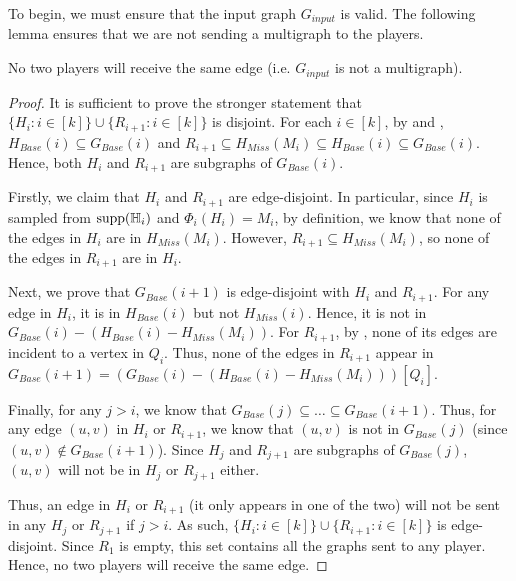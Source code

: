 \documentclass[11pt]{article}
\begin{document}
To begin, we must ensure that the input graph $G_{input}$ is valid. The following lemma ensures that we are not sending a multigraph to the players. 

\begin{lemma}\label{graph-is-not-multi}
    No two players will receive the same edge (i.e. $G_{input}$ is not a multigraph).
\end{lemma}
\begin{proof}
It is sufficient to prove the stronger statement that $\{H_i:i\in[k]\}\cup \{R_{i+1}:i\in[k]\}$ is disjoint. For each $i\in [k]$, by  and , $H_{Base}(i)\subseteq G_{Base}(i)$ and $R_{i+1}\subseteq H_{Miss}(M_i)\subseteq H_{Base}(i)\subseteq G_{Base}(i)$. Hence, both $H_i$ and $R_{i+1}$ are subgraphs of $G_{Base}(i)$. 

Firstly, we claim that $H_i$ and $R_{i+1}$ are edge-disjoint. In particular, since $H_i$ is sampled from $\textnormal{\text{supp}}(\mathbb{H}_i)$ and $\Phi_i(H_i)=M_i$, by definition, we know that none of the edges in $H_i$ are in $H_{Miss}(M_i)$. However, $R_{i+1}\subseteq H_{Miss}(M_i)$, so none of the edges in $R_{i+1}$ are in $H_i$.

Next, we prove that $G_{Base}(i+1)$ is edge-disjoint with $H_i$ and $R_{i+1}$. For any edge in $H_i$, it is in $H_{Base}(i)$ but not $H_{Miss}(i)$. Hence, it is not in $G_{Base}(i)-(H_{Base}(i)-H_{Miss}(M_i))$. For $R_{i+1}$, by , none of its edges are incident to a vertex in $Q_i$. Thus, none of the edges in $R_{i+1}$ appear in $G_{Base}(i+1)=(G_{Base}(i)-(H_{Base}(i)-H_{Miss}(M_i)))[Q_i]$.

Finally, for any $j>i$, we know that $G_{Base}(j)\subseteq \dots\subseteq G_{Base}(i+1)$. Thus, for any edge $(u, v)$ in $H_i$ or $R_{i+1}$, we know that $(u, v)$ is not in $G_{Base}(j)$ (since $(u, v)\not\in G_{Base}(i+1)$). Since $H_j$ and $R_{j+1}$ are subgraphs of $G_{Base}(j)$, $(u, v)$ will not be in $H_j$ or $R_{j+1}$ either. 

Thus, an edge in $H_i$ or $R_{i+1}$ (it only appears in one of the two) will not be sent in any $H_j$ or $R_{j+1}$ if $j>i$. As such, $\{H_i:i\in[k]\}\cup \{R_{i+1}:i\in[k]\}$ is edge-disjoint. Since $R_1$ is empty, this set contains all the graphs sent to any player. Hence, no two players will receive the same edge.
\end{proof}
\end{document}
